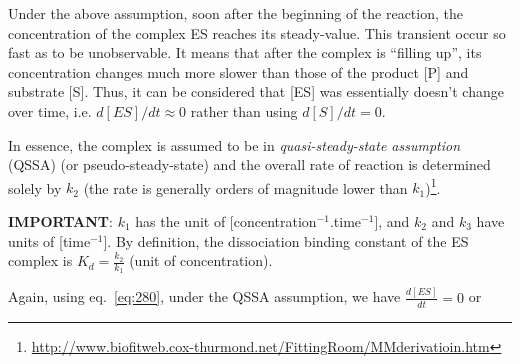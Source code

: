   Under the above assumption, soon after the beginning of the
  reaction, the concentration of the complex ES reaches its
  steady-value. This transient occur so fast as to be unobservable. It
  means that after the complex is ``filling up'', its concentration
  changes much more slower than those of the product [P] and substrate
  [S]. Thus, it can be considered that [ES] was essentially doesn't
  change over time, i.e. $d[ES]/dt\approx 0$ rather than using
  $d[S]/dt=0$. 

In essence, the complex is assumed to be in    {\it quasi-steady-state
assumption} (QSSA) (or pseudo-steady-state)  and the overall rate of reaction is
determined solely by $k_2$ (the rate is  generally orders of magnitude lower
than $k_1$)\footnote{\url{http://www.biofitweb.cox-thurmond.net/FittingRoom/MMderivatioin.htm}}.



{\bf IMPORTANT}: $k_1$ has the unit of
[concentration$^{-1}$.time$^{-1}$], and $k_2$ and $k_3$ have
units of [time$^{-1}$]. By definition, the dissociation binding
constant of the ES complex is $K_d = \frac{k_2}{k_1}$ (unit of
concentration).

Again, using eq.~\eqref{eq:280}, under the QSSA assumption, we have
$\frac{d[ES]}{dt}=0$ or

